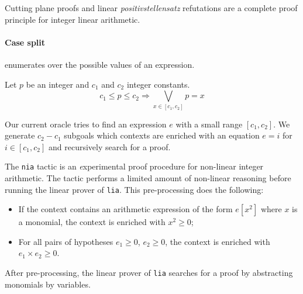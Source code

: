 Cutting plane proofs and linear \emph{positivstellensatz} refutations are a complete proof principle for integer linear arithmetic.

\paragraph{Case split} enumerates over the possible values of an expression.
\begin{theorem}
  Let $p$ be an integer and $c_1$ and $c_2$  integer constants.
  \[
  c_1 \le p \le c_2 \Rightarrow \bigvee_{x \in [c_1,c_2]} p = x
  \]
\end{theorem}
Our current oracle tries to find an expression $e$ with a small range $[c_1,c_2]$.
%
We generate $c_2 - c_1$ subgoals which contexts are enriched with an equation $e = i$ for $i \in [c_1,c_2]$ and
recursively search for a proof.

\label{sec:nia}
The {\tt nia} tactic is an {\emph experimental} proof procedure for non-linear  integer arithmetic.
%
The tactic performs a limited amount of non-linear reasoning before running the
linear prover of {\tt lia}.
This pre-processing does the following:
\begin{itemize}
\item If the context contains an arithmetic expression of the form $e[x^2]$ where $x$ is a
  monomial, the context is enriched with $x^2\ge 0$;
\item For all pairs of hypotheses $e_1\ge 0$, $e_2 \ge 0$, the context is enriched with $e_1 \times e_2 \ge 0$.
\end{itemize}
After pre-processing, the linear prover of {\tt lia} searches for a proof
by abstracting monomials by variables.



